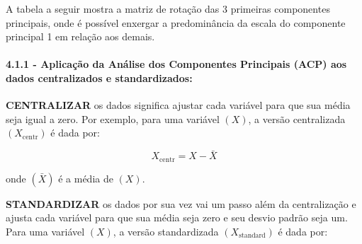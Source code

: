 \documentclass[
  letterpaper,
  DIV=11,
  numbers=noendperiod]{scrartcl}
\let\oldparagraph\paragraph
\renewcommand{\paragraph}[1]{\oldparagraph{#1}\mbox{}}
\begin{document}
A tabela a seguir mostra a matriz de rotação das 3 primeiras componentes
principais, onde é possível enxergar a predominância da escala do
componente principal 1 em relação aos demais.

\begin{table}[!h]
\centering
\caption{\label{tab:unnamed-chunk-19}Scores dos Três Primeiros Componentes Principais}
\centering
{}
\end{table}

\paragraph{4.1.1 - Aplicação da Análise dos Componentes Principais (ACP)
aos dados centralizados e
standardizados:}\label{aplicauxe7uxe3o-da-anuxe1lise-dos-componentes-principais-acp-aos-dados-centralizados-e-standardizados}

\textbf{CENTRALIZAR} os dados significa ajustar cada variável para que
sua média seja igual a zero. Por exemplo, para uma variável \((X)\), a
versão centralizada \((X_{\text{centr}})\) é dada por:

\[ X_{\text{centr}} = X - \bar{X}\]

onde \((\bar{X})\) é a média de \((X)\).

\textbf{STANDARDIZAR} os dados por sua vez vai um passo além da
centralização e ajusta cada variável para que sua média seja zero e seu
desvio padrão seja um. Para uma variável \((X)\), a versão standardizada
\((X_{\text{standard}})\) é dada por:
\end{document}
